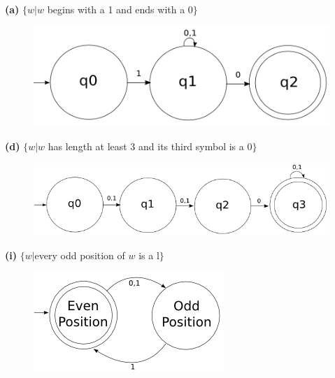 \documentclass[11pt]{article}
\renewcommand{\part}[1] {\vspace{.10in} {\bf (#1)}}
\begin{document}
\part{a} $\{w | w$ begins with a 1 and ends with a 0$\}$
\begin{figure}[h!]
  \begin{center}
    \includegraphics[scale=0.40]{2a.png}
  \end{center}
\end{figure}

\part{d} $\{w | w$ has length at least 3 and its third symbol is a 0$\}$
\begin{figure}[h!]
  \begin{center}
    \includegraphics[scale=0.40]{2d.png}
  \end{center}
\end{figure}

\pagebreak

\part{i} $\{w | $every odd position of $w$ is a l$\}$  
\begin{figure}[h!]
  \begin{center}
    \includegraphics[scale=0.40]{2i.png}
  \end{center}
\end{figure}
\end{document}
